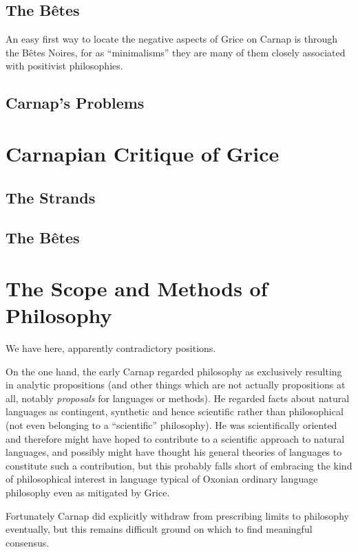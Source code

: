 \documentclass[10pt,titlepage]{book}
\begin{document}
\subsection{The B\^etes}

An easy first way to locate the negative aspects of Grice on Carnap is through the B\^etes Noires, for as ``minimalisms'' they are many of them closely associated with positivist philosophies.

\subsection{Carnap's Problems}

\section{Carnapian Critique of Grice}

\subsection{The Strands}

\subsection{The B\^etes}

\section{The Scope and Methods of Philosophy}

We have here, apparently contradictory positions.

On the one hand, the early Carnap regarded philosophy as exclusively resulting in analytic propositions (and other things which are not actually propositions at all, notably {\it proposals} for languages or methods).
He regarded facts about natural languages as contingent, synthetic and hence scientific rather than philosophical (not even belonging to a ``scientific'' philosophy).
He was scientifically oriented and therefore might have hoped to contribute to a scientific approach to natural languages, and possibly might have thought his general theories of languages to constitute such a contribution, but this probably falls short of embracing the kind of philosophical interest in language typical of Oxonian ordinary language philosophy even as mitigated by Grice.

Fortunately Carnap did explicitly withdraw from prescribing limits to philosophy eventually, but this remains difficult ground on which to find meaningful consensus.
\end{document}

